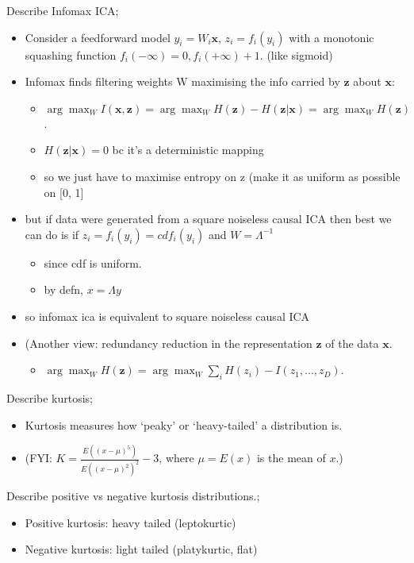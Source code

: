 \documentclass{article}
\begin{document}
Describe Infomax ICA; \begin{itemize} \item Consider a feedforward model $y_i=W_i\mathbf{x}$, $z_i=f_i(y_i)$ with a monotonic squashing function $f_i(-\infty)=0, f_i(+\infty)+1$. (like sigmoid) \item Infomax finds filtering weights W maximising the info carried by $\mathbf{z}$ about $\mathbf{x}$: \begin{itemize} \item $\arg\max_W I(\mathbf{x, z}) = \arg\max_W H(\mathbf{z})-H(\mathbf{z|x})=\arg\max_WH(\mathbf{z})$. \item $H(\mathbf{z|x})=0$ bc it's a deterministic mapping \item so we just have to maximise entropy on z (make it as uniform as possible on [0, 1] \end{itemize} \item but if data were generated from a square noiseless causal ICA then best we can do is if $z_i=f_i(y_i)=cdf_i(y_i)$ and $W=\Lambda^{-1}$ \begin{itemize} \item since cdf is uniform. \item by defn, $x=\Lambda y$ \end{itemize} \item so infomax ica is equivalent to square noiseless causal ICA \item (Another view: redundancy reduction in the representation $\mathbf{z}$ of the data $\mathbf{x}$. \begin{itemize} \item $\arg\max_W H(\mathbf{z})=\arg\max_W\sum_i H(z_i)-I(z_1,...,z_D)$. \end{itemize} \end{itemize}

Describe kurtosis; \begin{itemize} \item Kurtosis measures how `peaky' or `heavy-tailed' a distribution is. \item (FYI: $K=\frac{E((x-\mu)^5)}{E((x-\mu)^2)^2}-3$, where $\mu=E(x)$ is the mean of $x$.) \end{itemize}

Describe positive vs negative kurtosis distributions.; \begin{itemize} \item Positive kurtosis: heavy tailed (leptokurtic) \item Negative kurtosis: light tailed (platykurtic, flat) \end{itemize}
\end{document}
